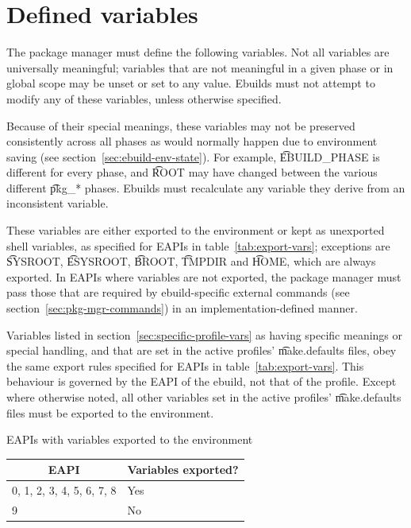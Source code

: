 \section{Defined variables}
\label{sec:ebuild-env-vars}

The package manager must define the following variables. Not all variables are universally
meaningful; variables that are not meaningful in a given phase or in global scope may be unset
or set to any value. Ebuilds must not attempt to modify any of these variables, unless otherwise
specified.

Because of their special meanings, these variables may not be preserved consistently across all
phases as would normally happen due to environment saving (see section~\ref{sec:ebuild-env-state}).
For example, \t{EBUILD_PHASE} is different for every phase, and \t{ROOT} may have changed between
the various different \t{pkg_*} phases. Ebuilds must recalculate any variable they derive from an
inconsistent variable.

 These variables are either exported to the environment or kept as
unexported shell variables, as specified for EAPIs in table~\ref{tab:export-vars}; exceptions are
\t{SYSROOT}, \t{ESYSROOT}, \t{BROOT}, \t{TMPDIR} and \t{HOME}, which are always exported.
In EAPIs where variables are not exported, the package manager must pass those that are required
by ebuild-specific external commands (see section~\ref{sec:pkg-mgr-commands}) in an
implementation-defined manner.

Variables listed in section~\ref{sec:specific-profile-vars} as having specific meanings or special
handling, and that are set in the active profiles' \t{make.defaults} files, obey the same export
rules specified for EAPIs in table~\ref{tab:export-vars}. This behaviour is governed by the EAPI
of the ebuild, not that of the profile. Except where otherwise noted, all other variables set in
the active profiles' \t{make.defaults} files must be exported to the environment.

\begin{centertable}{EAPIs with variables exported to the environment}
    \label{tab:export-vars}
    \begin{tabular}{ll}
      \toprule
      \multicolumn{1}{c}{\textbf{EAPI}} &
      \multicolumn{1}{c}{\textbf{Variables exported?}} \\
      \midrule
      0, 1, 2, 3, 4, 5, 6, 7, 8 & Yes \\
      9                         & No  \\
      \bottomrule
    \end{tabular}
\end{centertable}

